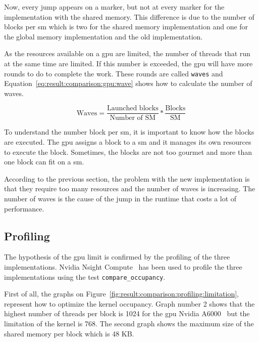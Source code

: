 Now, every jump appears on a marker, but not at every marker for the implementation
with the shared memory.
This difference is due to the number of blocks per \acrshort{sm} which is two for
the shared memory implementation and one for the global memory implementation
and the old implementation.

As the resources available on a \acrshort{gpu} are limited, the number of
threads that run at the same time are limited.
If this number is exceeded, the \acrshort{gpu} will have more rounds to do to
complete the work.
These rounds are called \texttt{waves} and Equation~\ref{eq:result:comparison:gpu:wave}
shows how to calculate the number of waves.

\begin{equation}
    \text{Waves} = \frac{\text{Launched blocks}}{\text{Number of SM}} * \frac{\text{Blocks}}{\text{SM}}
    \label{eq:result:comparison:gpu:wave}
\end{equation}

To understand the number block per \acrshort{sm}, it is important to know how
the blocks are executed.
The \acrshort{gpu} assigns a block to a \acrshort{sm} and it manages its own
resources to execute the block.
Sometimes, the blocks are not too gourmet and more than one block can fit on
a \acrshort{sm}.

According to the previous section, the problem with the new implementation is
that they require too many resources and the number of waves is increasing.
The number of waves is the cause of the jump in the runtime that costs a lot of
performance.


\subsection{Profiling}
\label{ch:result:comparison:profiling}

The hypothesis of the \acrshort{gpu} limit is confirmed by the profiling of the
three implementations.
Nvidia Nsight Compute~\cite{nsight-compute} has been used to profile the three
implementations using the test \texttt{compare\_occupancy}.

First of all, the graphs on Figure~\ref{fig:result:comparison:profiling:limitation},
represent how to optimize the kernel occupancy.
Graph number 2 shows that the highest number of threads per block is 1024
for the \acrshort{gpu} Nvidia A6000~\cite{nvidia-a6000} but the limitation of
the kernel is 768.
The second graph shows the maximum size of the shared memory per block which is
48 KB.

